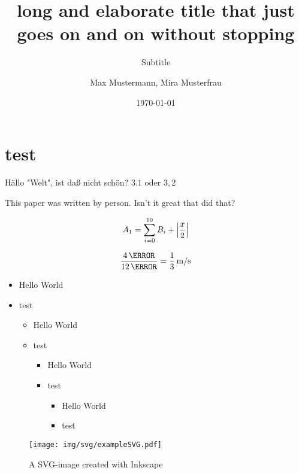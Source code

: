 \documentclass[todos=off]{HsH-report}
\author{
	Max Mustermann,
	Mira Musterfrau
}
\title{long and elaborate title that just goes on and on without stopping}
\subtitle{Subtitle}
\date{\today}
\begin{document}
	\frontmatter
	\maketitle

	\declarationofauthorship

	\begin{abstract}
		\lipsum[3-5]
	\end{abstract}

	\tableofcontents
	\mainmatter

	\chapter{test}

		Hällo "Welt", ist daß nicht schön? $3.1$ oder $3,2$

		This paper was written by  person.
		Isn't it great that  did that?

		\begin{equation}
			A_1 = \sum_{i=0}^{10} B_i + \left\vert\frac{x}{2}\right\vert
		\end{equation}

		\begin{equation}
			\frac{4\,\m}{12\,\s} = \frac{1}{3}\,\unit{m\per s}
		\end{equation}


		\begin{itemize}
			\item Hello World
			\item test
			\begin{itemize}
				\item Hello World
				\item test
				\begin{itemize}
					\item Hello World
					\item test
					\begin{itemize}
						\item Hello World
						\item test
					\end{itemize}
				\end{itemize}
			\end{itemize}
		\end{itemize}

		\begin{figure}
			\texttt{[image: img/svg/exampleSVG.pdf]}
			\caption{A SVG-image created with Inkscape}
		\end{figure}
\end{document}
